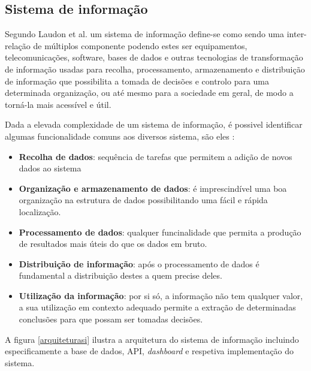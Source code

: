   
\subsection{Sistema de informação}


Segundo Laudon et al. \cite{Laudon1998}  um sistema de informação define-se como sendo uma inter-relação de múltiplos componente podendo estes ser equipamentos, telecomunicações, software, bases de dados e outras tecnologias de transformação de informação usadas para recolha, processamento, armazenamento e distribuição de informação que possibilita a tomada de decisões e controlo para uma determinada organização, ou até mesmo para a sociedade em geral, de modo a torná-la mais acessível e útil.

Dada a elevada complexidade de um sistema de informação, é possivel identificar algumas funcionalidade comuns aos diversos sistema, são eles \cite{Turban1996}: 

\begin{itemize}
	\item \textbf{Recolha de dados}: sequência de tarefas que permitem a adição de novos dados ao sistema
	\item \textbf{Organização e armazenamento de dados}: é imprescindível uma boa organização na estrutura de dados possibilitando uma fácil e rápida localização.
	\item \textbf{Processamento de dados}: qualquer funcinalidade que permita a produção de resultados mais úteis do que os dados em bruto. 
	 
	\item \textbf{Distribuição de informação}: após o processamento de dados é fundamental a distribuição destes a quem precise deles.
	
	\item \textbf{Utilização da informação}: por si só, a informação não tem qualquer valor, a sua utilização em contexto adequado permite a extração de determinadas conclusões para que possam ser tomadas decisões.
	
\end{itemize}



A figura \ref{arquiteturasi} ilustra a arquitetura do sistema de informação incluindo especificamente a base de dados, \ac{API}, \textit{dashboard} e respetiva implementação do sistema. 


